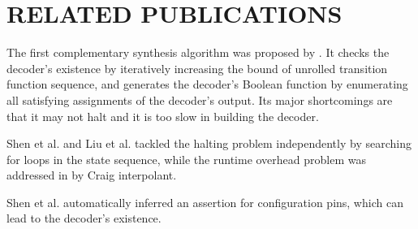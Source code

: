 \documentclass[conference]{IEEEtran}
\begin{document}
 















\section{RELATED PUBLICATIONS}\label{sec_relwork}
%
%

The first complementary synthesis algorithm was proposed by \cite{ShenICCAD09}.
It checks the decoder's existence by iteratively increasing the bound of unrolled transition function sequence,
and generates the decoder's Boolean function by enumerating all satisfying assignments of the decoder's output.
Its major shortcomings are that it may not halt and it is too slow
in building the decoder.

Shen et al.\cite{ShenTCAD11} and Liu et al.\cite{LiuICCAD11} tackled the halting problem independently by searching for loops in the state sequence,
while the runtime overhead problem was addressed in \cite{ShenTCAD12,LiuICCAD11} by Craig interpolant\cite{Craig}.

Shen et al.\cite{ShenTCAD12} automatically inferred an assertion for configuration pins, 
which can lead to the decoder's existence.
\end{document}
